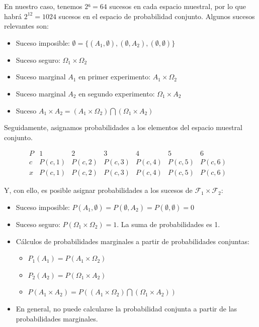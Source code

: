 \documentclass[11pt]{article}
\begin{document}
En nuestro caso, tenemos \(2⁶= 64\) sucesos en cada espacio muestral,
por lo que habrá \(2^12=1024\) sucesos en el espacio de probabilidad
conjunto. Algunos sucesos relevantes son: 
\begin{itemize}
\item Suceso imposible:
\(\emptyset = \{(A_1,\emptyset),(\emptyset,A_2),(\emptyset,\emptyset)\}\)
\item Suceso seguro: \(\Omega_1 \times \Omega_2\) 
\item Suceso marginal \(A_1\)
en primer experimento: \(A_1 \times \Omega_2\) 
\item Suceso marginal \(A_2\)
en segundo experimento: \(\Omega_1 \times A_2\) 
\item Suceso
\(A_1 \times A_2 = (A_1 \times \Omega_2) \bigcap (\Omega_1 \times A_2)\)
\end{itemize}

    Seguidamente, asignamos probabilidades a los elementos del espacio
muestral conjunto.

\[
\begin{array}{c|cccccccc|c}
  P & 1 & 2 & 3 & 4 & 5 & 6 & \\ 
  \hline
  c & P(c,1) & P(c,2) & P(c,3) & P(c,4) & P(c,5) & P(c,6) &  \\
  \hline
  x & P(c,1) & P(c,2) & P(c,3) & P(c,4) & P(c,5) & P(c,6) & 
 \end{array}
\]

Y, con ello, es posible asignar probabilidades a los sucesos de
\(\mathscr{F}_1\times \mathscr{F}_2\): 
\begin{itemize}
\item Suceso imposible:
\(P(A_1,\emptyset)=P(\emptyset,A_2)=P(\emptyset,\emptyset)=0\) 
\item Suceso
seguro: \(P(\Omega_1 \times \Omega_2)=1\). La suma de probabilidades es
1. 
\item Cálculos de probabilidades marginales a partir de probabilidades
conjuntas: 
\begin{itemize}
\item \(P_1(A_1)=P(A_1 \times \Omega_2)\) 
\item \(P_2(A_2)=P(\Omega_1 \times A_2)\) 
\item
\(P(A_1 \times A_2) = P((A_1 \times \Omega_2) \bigcap (\Omega_1 \times A_2))\)
\end{itemize}
\item En general, no puede calcularse la probabilidad conjunta a partir de
las probabilidades marginales.
\end{itemize}
\end{document}
